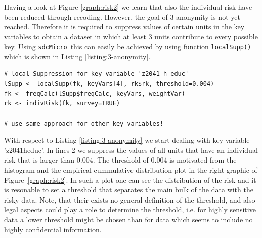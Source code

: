 \documentclass[12pt]{article}
\newcommand{\sdcMicro}{\texttt{sdcMicro}}
\begin{document}
Having a look at Figure \ref{graph:risk2} we learn that also the individual risk have been reduced through recoding. However, the goal of 3-anonymity is not yet reached. Therefore it is required to suppress values of certain units in the key variables to obtain a dataset in which at least 3 units contribute to every possible key. Using \sdcMicro~this can easily be achieved by using function \lstinline{localSupp()} which is shown in Listing \ref{listing:3-anonymity}.

\begin{lstlisting}[captionpos=b, caption={Achieving 3-anonymity}, label=listing:3-anonymity]
# local Suppression for key-variable 'z2041_h_educ'
lSupp <- localSupp(fk, keyVars[4], rk$rk, threshold=0.004)
fk <- freqCalc(lSupp$freqCalc, keyVars, weightVar)
rk <- indivRisk(fk, survey=TRUE)

# use same approach for other key variables!
\end{lstlisting}

%
%
%

With respect to Listing \ref{listing:3-anonymity} we start dealing 
with key-variable 'z2041\textunderscore h\textunderscore educ'. In lines 2 we 
suppress the values of all units that have an individual risk that is larger than 0.004. The threshold of 0.004 is
motivated from the histogram and the empirical cummulative distribution plot in the right graphic of Figure~\ref{graph:risk2}. 
In such a plot one can see the distribution of the risk and it is resonable to set a threshold that separates the main bulk of the data with the
risky data. Note, that their exists no general definition of the threshold, and also legal aspects could play 
a role to determine the threshold, i.e. for highly sensitive data a lower threshold might be chosen than for data 
which seems to include no highly confidential information.
\end{document}
